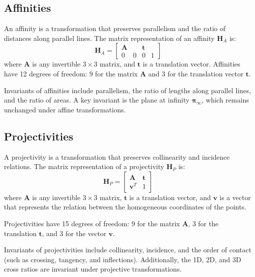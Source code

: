 \subsection{Affinities}

An affinity is a transformation that preserves parallelism and the ratio of distances along parallel lines. 
The matrix representation of an affinity $\mathbf{H}_A$ is:
\[\mathbf{H}_A = \begin{bmatrix}
    \mathbf{A} & & \mathbf{t} & \\
    0 & 0 & 0 & 1
\end{bmatrix}\]
where $\mathbf{A}$ is any invertible $3 \times 3$ matrix, and $\mathbf{t}$ is a translation vector. 
Affinities have 12 degrees of freedom: 9 for the matrix $\mathbf{A}$ and 3 for the translation vector $\mathbf{t}$.

Invariants of affinities include parallelism, the ratio of lengths along parallel lines, and the ratio of areas. 
A key invariant is the plane at infinity $\boldsymbol{\pi}_{\infty}$, which remains unchanged under affine transformations.

\subsection{Projectivities}
A projectivity is a transformation that preserves collinearity and incidence relations. 
The matrix representation of a projectivity $\mathbf{H}_P$ is:
\[\mathbf{H}_P = \begin{bmatrix}
    \mathbf{A} & \mathbf{t} \\
    \mathbf{v}^T & 1
\end{bmatrix}\]
where $\mathbf{A}$ is any invertible $3 \times 3$ matrix, $\mathbf{t}$ is a translation vector, and $\mathbf{v}$ is a vector that represents the relation between the homogeneous coordinates of the points.

Projectivities have 15 degrees of freedom: 9 for the matrix $\mathbf{A}$, 3 for the translation $\mathbf{t}$, and 3 for the vector $\mathbf{v}$.

Invariants of projectivities include collinearity, incidence, and the order of contact (such as crossing, tangency, and inflections). Additionally, the 1D, 2D, and 3D cross ratios are invariant under projective transformations.
